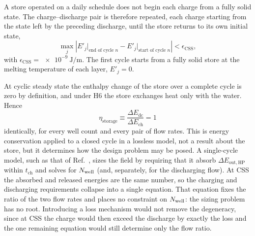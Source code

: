 A store operated on a daily schedule does not begin each charge from a fully
solid state. The charge--discharge pair is therefore repeated, each charge
starting from the state left by the preceding discharge, until the store
returns to its own initial state,
\begin{equation}
  \max_{j}\left|E'_j\big|_{\text{end of cycle }n}-E'_j\big|_{\text{start of cycle }n}\right|
  <\epsilon_\mathrm{CSS},
  \label{eq:css-test}
\end{equation}
with $\epsilon_\mathrm{CSS}=\SI{e-9}{\joule\per\meter}$. The first cycle
starts from a fully solid store at the melting temperature of each layer,
$E'_j=0$.

At cyclic steady state the enthalpy change of the store over a complete cycle
is zero by definition, and under H6 the store exchanges heat only with the
water. Hence
\begin{equation}
  \eta_\mathrm{storage}\equiv\frac{\Delta E_\mathrm{dc}}{\Delta E_\mathrm{ch}}=1
  \label{eq:css-unity}
\end{equation}
identically, for every well count and every pair of flow rates. This is
energy conservation applied to a closed cycle in a lossless model, not a
result about the store, but it determines how the design problem may be posed.
A single-cycle model, such as that of Ref.~\cite{KoIHTC2026}, sizes the field
by requiring that it absorb $\Delta E_\mathrm{out,HP}$ within $t_\mathrm{ch}$
and solves for $N_{\mathrm{well}}$ (and, separately, for the discharging flow). At CSS the
absorbed and released energies are the same number, so the charging and
discharging requirements collapse into a single equation. That equation
fixes the ratio of the two flow rates and places no constraint on $N_{\mathrm{well}}$: the
sizing problem has no root. Introducing a loss mechanism would not remove the
degeneracy, since at CSS the charge would then exceed the discharge by exactly
the loss and the one remaining equation would still determine only the flow
ratio.

